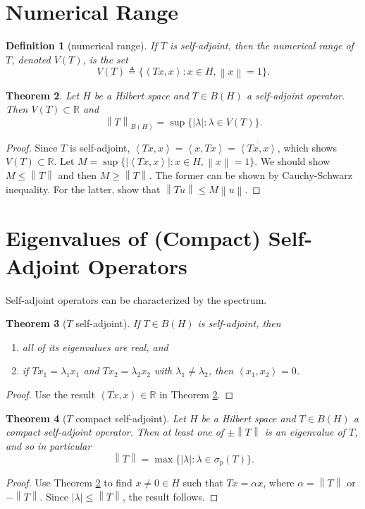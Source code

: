\documentclass[12pt,a4paper]{report}
\numberwithin{equation}{section}
\theoremstyle{mystyle}
\newtheorem{definition}{Definition}[section]
\newtheorem{theorem}[definition]{Theorem}
\newcommand{\R}{\mathbb{R}}
\newcommand{\abs}[1]{\left\lvert #1 \right\rvert}
\newcommand{\norm}[1]{\left\lVert #1 \right\rVert}
\newcommand{\inner}[1]{\left\langle #1 \right\rangle}
\begin{document}
	\section{Numerical Range}
	\begin{definition}[numerical range]
		If $T$ is self-adjoint, then the \emph{numerical range} of $T$, denoted $V(T)$, is the set
		$$
		V(T)\triangleq \{\inner{Tx,x}: x\in H, \norm{x}=1\}.
		$$
	\end{definition}

	\begin{theorem}\label{thm:numerical range}
		Let $H$ be a Hilbert space and $T\in B(H)$ a self-adjoint operator. Then $V(T)\subset \R$ and
		$$
			\norm{T}_{B(H)}=\sup\{|\lambda|:\lambda\in V(T)\}.
		$$
	\end{theorem}
	\begin{proof}
		Since $T$ is self-adjoint, $\inner{Tx,x}=\inner{x,Tx}=\overline{\inner{Tx,x}}$, which shows $V(T)\subset \R$. Let $M=\sup\{\abs{\inner{Tx,x}}:x\in H,\norm{x}=1\}$. We should show $M\leq \norm{T}$ and then $M\geq \norm{T}$. The former can be shown by Cauchy-Schwarz inequality. For the latter, show that $\norm{Tu}\leq M \norm{u}$.
	\end{proof}
	
	
	\section{Eigenvalues of (Compact) Self-Adjoint Operators}
	Self-adjoint operators can be characterized by the spectrum.
	\begin{theorem}[$T$ self-adjoint]
		If $T\in B(H)$ is self-adjoint, then
		\begin{enumerate}
			\item all of its eigenvalues are real, and
			\item if $Tx_1=\lambda_1 x_1$ and $Tx_2=\lambda_2 x_2$ with $\lambda_1\neq \lambda_2$, then $\inner{x_1,x_2}=0$.
		\end{enumerate}
	\end{theorem}
	\begin{proof}
		Use the result $\inner{Tx,x}\in \R$ in Theorem \ref{thm:numerical range}.
	\end{proof}
	
	\begin{theorem}[$T$ compact self-adjoint]\label{thm:compact self-adjoint}
		Let $H$ be a Hilbert space and $T\in B(H)$ a compact self-adjoint operator. Then at least one of $\pm \norm{T}$ is an eigenvalue of $T$, and so in particular
		$$
		\norm{T}=\max\{\abs{\lambda}:\lambda\in \sigma_p (T)\}.
		$$
	\end{theorem}
	\begin{proof}
		Use Theorem \ref{thm:numerical range} to find $x\neq 0\in H$ such that $Tx=\alpha x$, where $\alpha =\norm{T}$ or $-\norm{T}$. Since $|\lambda|\leq \norm{T}$, the result follows.
	\end{proof}
	
\end{document}
